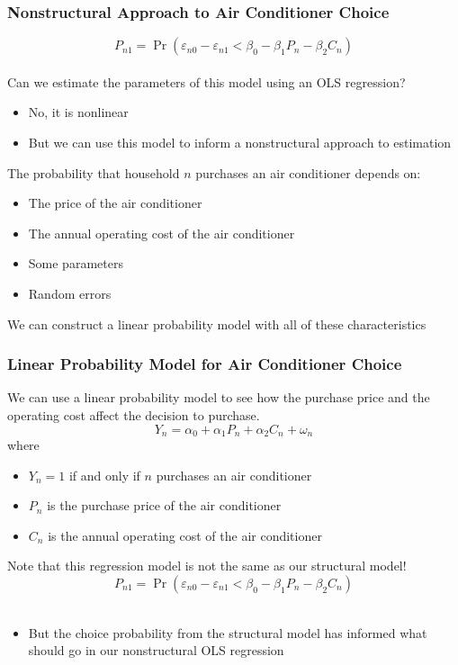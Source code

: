 \documentclass{beamer}\usepackage[]{graphicx}\usepackage[]{xcolor}
\begin{document}
\begin{frame}\frametitle{Nonstructural Approach to Air Conditioner Choice}
    \vspace{-2ex}
    $$P_{n1} = \Pr(\varepsilon_{n0} - \varepsilon_{n1} < \beta_0 - \beta_1 P_n - \beta_2 C_n)$$ \\
    \vspace{1ex}
    Can we estimate the parameters of this model using an OLS regression?
    \begin{itemize}
        \item No, it is nonlinear
        \item But we can use this model to inform a nonstructural approach to estimation
    \end{itemize}
    \vspace{2ex}
    The probability that household $n$ purchases an air conditioner depends on:
    \begin{itemize}
        \item The price of the air conditioner
        \item The annual operating cost of the air conditioner
        \item Some parameters
        \item Random errors
    \end{itemize}
    \vspace{2ex}
    We can construct a linear probability model with all of these characteristics
\end{frame}

\begin{frame}\frametitle{Linear Probability Model for Air Conditioner Choice}
    We can use a linear probability model to see how the purchase price and the operating cost affect the decision to purchase.
    $$Y_n = \alpha_0 + \alpha_1 P_n + \alpha_2 C_n + \omega_n$$
    where
    \begin{itemize}
        \item $Y_n = 1$ if and only if $n$ purchases an air conditioner
        \item $P_n$ is the purchase price of the air conditioner
        \item $C_n$ is the annual operating cost of the air conditioner
    \end{itemize}
    \vspace{3ex}
    Note that this regression model is not the same as our structural model!
    $$P_{n1} = \Pr(\varepsilon_{n0} - \varepsilon_{n1} < \beta_0 - \beta_1 P_n - \beta_2 C_n)$$ \\
    \begin{itemize}
        \item But the choice probability from the structural model has informed what should go in our nonstructural OLS regression
    \end{itemize}
\end{frame}
\end{document}

